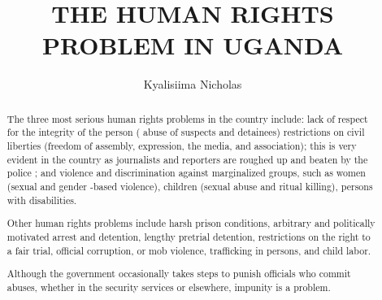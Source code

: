 \documentclass{article}
\begin{document}
\title{THE HUMAN RIGHTS PROBLEM IN UGANDA {}}
\author{Kyalisiima Nicholas}
\maketitle
\begin{abstract}
The three most serious human rights problems in the country include: lack of respect for the integrity of the person ( abuse of suspects and detainees) restrictions on civil liberties (freedom of assembly, expression, 
the media, and association); this is very evident in the country as journalists and reporters are roughed up and beaten by the police ; and violence and discrimination against marginalized groups, such as women (sexual and gender
-based violence), children (sexual abuse and ritual killing), persons with disabilities.

 Other human rights problems include harsh prison conditions, arbitrary and politically motivated arrest and detention, lengthy pretrial detention, restrictions on the right to a fair trial, official corruption, or mob violence, trafficking in persons, and child labor.

Although the government occasionally takes steps to punish officials who commit abuses, whether in the security services or elsewhere, impunity is a problem.

\end{abstract}
\end{document}
